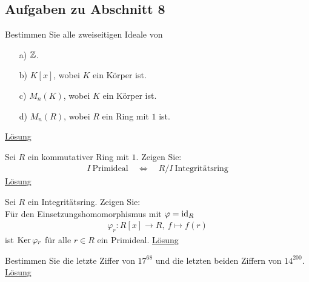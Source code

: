 \subsection{Aufgaben zu Abschnitt 8}

\begin{exe}\label{aufgabe:8.1}
	Bestimmen Sie alle zweiseitigen Ideale von
	\begin{enumerate}
		\item[a)] $ \mathbb{Z} $.
		
		\item[b)] $ K[x] $, wobei $ K $ ein Körper ist.
		
		\item[c)] $ M_n(K) $, wobei $ K $ ein Körper ist.
		
		\item[d)] $ M_n(R) $, wobei $ R $ ein Ring mit $ 1 $ ist.
	\end{enumerate}
	\hyperlink{loes:8.1}{Lösung}
\end{exe}

\begin{exe}\label{aufgabe:8.2}
	Sei $ R $ ein kommutativer Ring mit $ 1 $.
	Zeigen Sie:
	\begin{align*}
	I \ \text{Primideal} \quad \Leftrightarrow \quad R/I \ \text{Integritätsring}
	\end{align*}
	\hyperlink{loes:8.2}{Lösung}
\end{exe}

\begin{exe}\label{aufgabe:8.3}
	Sei $ R $ ein Integritätsring.
	Zeigen Sie:\\
	Für den Einsetzungshomomorphismus mit $ \varphi = \operatorname{id}_R $
	\begin{align*}
	\varphi_r : R[x] \to R, \ f \mapsto f(r)
	\end{align*}
	ist $ \operatorname{Ker} \varphi_r $ für alle $ r \in R $ ein Primideal.
	\hyperlink{loes:8.3}{Lösung}
\end{exe}

\begin{exe}\label{aufgabe:8.4}
	Bestimmen Sie die letzte Ziffer von $ 17^{68} $
	und die letzten beiden Ziffern von $ 14^{200} $.
	\hyperlink{loes:8.4}{Lösung}
\end{exe}